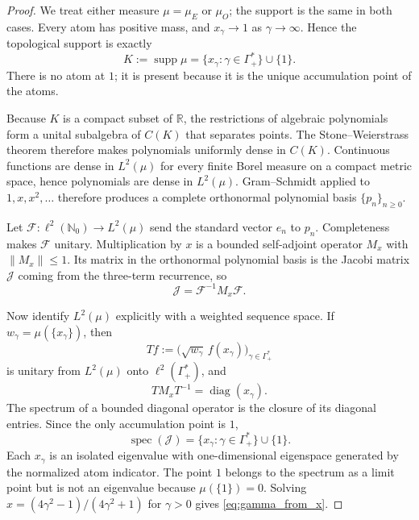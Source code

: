 \documentclass[11pt]{amsart}
\numberwithin{equation}{section}
\theoremstyle{plain}
\theoremstyle{definition}
\theoremstyle{remark}
\begin{document}
\begin{proof}
We treat either measure $\mu=\mu_E$ or $\mu_O$; the support is the same in both cases.  Every atom has positive mass, and
$x_\gamma\to1$ as $\gamma\to\infty$.  Hence the topological support is exactly
\begin{equation}
K:=\operatorname{supp}\mu
=\{x_\gamma:\gamma\in\Gamma_+^*\}\cup\{1\}.
\label{eq:measure_support_exact}
\end{equation}
There is no atom at $1$; it is present because it is the unique accumulation point of the atoms.

Because $K$ is a compact subset of $\mathbb R$, the restrictions of algebraic polynomials form a unital subalgebra of $C(K)$ that separates points.  The Stone--Weierstrass theorem therefore makes polynomials uniformly dense in $C(K)$.  Continuous functions are dense in $L^2(\mu)$ for every finite Borel measure on a compact metric space, hence polynomials are dense in $L^2(\mu)$.  Gram--Schmidt applied to $1,x,x^2,\ldots$ therefore produces a complete orthonormal polynomial basis $\{p_n\}_{n\ge0}$.

Let $\mathcal F:\ell^2(\mathbb N_0)\to L^2(\mu)$ send the standard vector $e_n$ to $p_n$.  Completeness makes $\mathcal F$ unitary.  Multiplication by $x$ is a bounded self-adjoint operator $M_x$ with $\|M_x\|\le1$.  Its matrix in the orthonormal polynomial basis is the Jacobi matrix $\mathcal J$ coming from the three-term recurrence, so
\begin{equation}
\mathcal J=\mathcal F^{-1}M_x\mathcal F.
\label{eq:Jacobi_multiplication_equivalence}
\end{equation}

Now identify $L^2(\mu)$ explicitly with a weighted sequence space.  If $w_\gamma=\mu(\{x_\gamma\})$, then
\begin{equation}
Tf:=\bigl(\sqrt{w_\gamma}\,f(x_\gamma)\bigr)_{\gamma\in\Gamma_+^*}
\end{equation}
is unitary from $L^2(\mu)$ onto $\ell^2(\Gamma_+^*)$, and
\begin{equation}
TM_xT^{-1}=\operatorname{diag}(x_\gamma).
\end{equation}
The spectrum of a bounded diagonal operator is the closure of its diagonal entries.  Since the only accumulation point is $1$,
\begin{equation}
\operatorname{spec}(\mathcal J)=\{x_\gamma:\gamma\in\Gamma_+^*\}\cup\{1\}.
\end{equation}
Each $x_\gamma$ is an isolated eigenvalue with one-dimensional eigenspace generated by the normalized atom indicator.  The point $1$ belongs to the spectrum as a limit point but is not an eigenvalue because $\mu(\{1\})=0$.  Solving
$x=(4\gamma^2-1)/(4\gamma^2+1)$ for $\gamma>0$ gives \eqref{eq:gamma_from_x}.


\end{proof}
\end{document}
